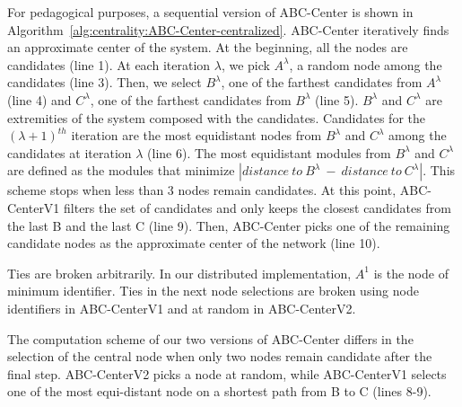 For pedagogical purposes, a sequential version of ABC-Center is shown in Algorithm~\ref{alg:centrality:ABC-Center-centralized}. ABC-Center iteratively finds an approximate center of the system. At the beginning, all the nodes are candidates (line 1). At each iteration $\lambda$, we pick $A^\lambda$, a random node among the candidates (line 3). Then, we select $B^\lambda$, one of the farthest candidates from $A^\lambda$ (line 4) and $C^\lambda$, one of the farthest candidates from $B^\lambda$ (line 5). $B^\lambda$ and $C^\lambda$ are extremities of the system composed with the candidates. Candidates for the $(\lambda+1)^{th}$ iteration are the most equidistant nodes from $B^\lambda$ and $C^\lambda$ among the candidates at iteration $\lambda$ (line 6). The most equidistant modules from $B^\lambda$ and $C^\lambda$ are defined as the modules that minimize $|distance\ to\ B^\lambda\ -\ distance\ to\ C^\lambda|$. This scheme stops when less than 3 nodes remain candidates. At this point, ABC-CenterV1 filters the set of candidates and only keeps the closest candidates from the last B and the last C (line 9). Then, ABC-Center picks one of the remaining candidate nodes as the approximate center of the network (line 10). 


Ties are broken arbitrarily. In our distributed implementation, $A^1$ is the node of minimum identifier. Ties in the next node selections are broken using node identifiers in ABC-CenterV1 and at random in ABC-CenterV2.

The computation scheme of our two versions of ABC-Center differs in the selection of the central node when only two nodes remain candidate after the final step. ABC-CenterV2 picks a node at random, while ABC-CenterV1 selects one of the most equi-distant node on a shortest path from B to C (lines 8-9). 


